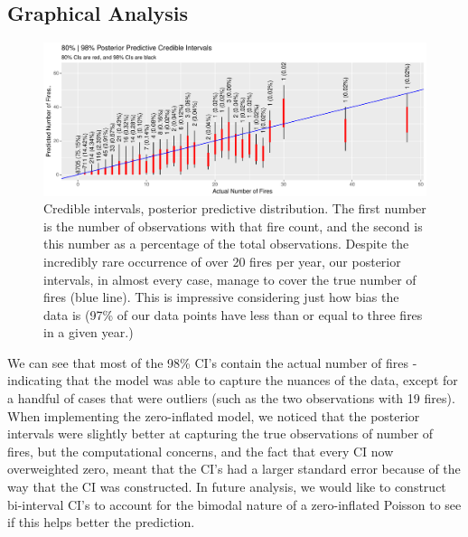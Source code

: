 \documentclass[10pt,a4paper, hidelinks]{article} %
\begin{document}
\subsection{Graphical Analysis}
\begin{figure}[H]
	\centering
	\includegraphics[width=1\linewidth]{../fig/CI_post_pred_intervals}
	\caption{Credible intervals, posterior predictive distribution.  The first number is the number of observations with that fire count, and the second is this number as a percentage of the total observations. Despite the incredibly rare occurrence of over 20 fires per year, our posterior intervals, in almost every case, manage to cover the true number of fires (blue line). This is impressive  considering just how bias the data is (97\% of our data points have less than or equal to three fires in a given year.)}
\label{fig:cipostpredintervals}
\end{figure}

We can see that most of the 98\% CI's contain the actual number of fires - indicating that the model was able to capture the nuances of the data, except for a handful of cases that were outliers (such as the two observations with 19 fires). When implementing the zero-inflated model, we noticed that the posterior intervals were slightly better at capturing the true observations of number of fires, but the computational concerns, and the fact that every CI now overweighted zero, meant that the CI's had a larger standard error because of the way that the CI was constructed. In future analysis, we would like to construct bi-interval CI's to account for the bimodal nature of a zero-inflated Poisson to see if this helps better the prediction.
\end{document}

